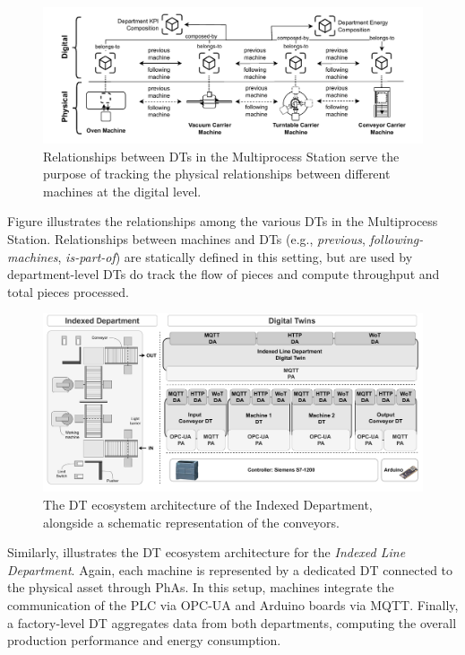 \begin{figure}
    \centering
    \includegraphics[width=\textwidth]{figures/engineering-wldt/Fischer-relationships.pdf}
    \caption{Relationships between \acp{DT} in the Multiprocess Station serve the purpose of tracking the physical relationships between different machines at the digital level.}
    \label{fig:dt-assets-relationships-overview}
\end{figure}

Figure  illustrates the relationships among the various \acp{DT} in the Multiprocess Station.
%
Relationships between machines and DTs (e.g., \emph{previous}, \emph{following-machines}, \emph{is-part-of}) are statically defined in this setting, but are used by department-level \acp{DT} do track the flow of pieces and compute throughput and total pieces processed.
%
\begin{figure}
    \centering
    \includegraphics[width=\textwidth]{figures/dt-interoperability/mf_dt_structure.pdf}
    \caption{The \acl{DT} ecosystem architecture of the Indexed Department, alongside a schematic representation of the conveyors.}
    \label{fig:indexed-department-dt-structure}
\end{figure}

Similarly,  illustrates the \ac{DT} ecosystem architecture for the \textit{Indexed Line Department}. Again, each machine is represented by a dedicated \ac{DT} connected to the physical asset through \acp{PhA}. In this setup, machines integrate the communication of the PLC via OPC-UA and Arduino boards via MQTT.
%
Finally, a factory-level \ac{DT} aggregates data from both departments, 
computing the overall production performance and energy consumption.


